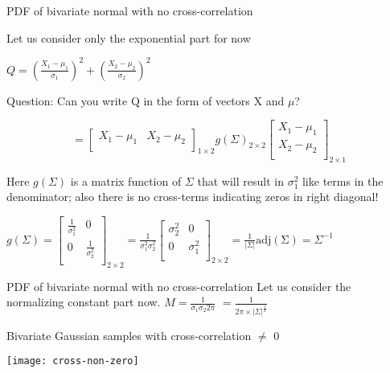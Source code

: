 \documentclass{beamer}
\begin{document}
\begin{frame}{PDF of bivariate normal with no cross-correlation}

Let us consider only the exponential part for now

$ Q =  \left(\frac{X_1-\mu_1}{\sigma_1}\right)^2 + \left(\frac{X_2-\mu_2}{\sigma_2}\right)^2 $

Question: Can you write Q in the form of vectors X and $\mu$?

$$
 = \begin{bmatrix}
	X_1 - \mu_1 &
	X_2 - \mu_2 \\
\end{bmatrix}_{1\times2}  g(\Sigma)_{2\times2} \begin{bmatrix}
X_1 - \mu_1 \\
X_2 - \mu_2 \\
\end{bmatrix}_{2\times1}
$$

Here $g(\Sigma)$ is a matrix function of $\Sigma$ that will result in $\sigma_1^2$ like terms in the denominator; also there is no cross-terms indicating zeros in right diagonal!

$g(\Sigma) = \begin{bmatrix}
 \frac{1}{\sigma_1^2}& 0  \\
 0 &  \frac{1}{\sigma_2^2} \\
\end{bmatrix}_{2\times2} = \frac{1}{\sigma_1^2 \sigma_2^2}\begin{bmatrix}
{\sigma_2^2}& 0  \\
0 &  {\sigma_1^2}   \\ 
\end{bmatrix}_{2\times2} = \frac{1}{|\Sigma|} \operatorname{adj(\Sigma)} = \Sigma^{-1}$
\end{frame}


\begin{frame}{PDF of bivariate normal with no cross-correlation}
Let us consider the normalizing constant part now.
$M = \frac{1}{\sigma_1 \sigma_2 2\pi }$
$=\frac{1}{2\pi \times |\Sigma|^{\frac{1}{2}}}$
\end{frame}

\begin{frame}{Bivariate Gaussian samples with cross-correlation  $\neq$ 0}
	\begin{center}
		\texttt{[image: cross-non-zero]}
	\end{center}
\end{frame}
\end{document}

